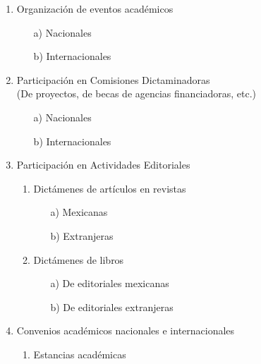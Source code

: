 \documentclass[12pt]{report}
\begin{document}
\begin{enumerate}
\begin{enumerate}
\begin{enumerate}
                \end{enumerate}
                \item Organización de eventos académicos
                        \begin{itemize}
                        \item[a)] Nacionales
                        \item[b)] Internacionales \\
                        \end{itemize}
                \item Participación en Comisiones Dictaminadoras\\ {\small (De proyectos, de becas de agencias financiadoras, etc.)}
                        \begin{itemize}
                        \item[a)] Nacionales
                        \item[b)] Internacionales \\
                        \end{itemize}
                \item Participación en Actividades Editoriales
                        \begin{enumerate}
                        \item Dictámenes de artículos en revistas
                                \begin{itemize}
                                \item[a)] Mexicanas
                                \item[b)] Extranjeras
                                \end{itemize}
                        \item Dictámenes de libros
                                \begin{itemize}
                                \item[a)] De editoriales mexicanas
                                \item[b)] De editoriales extranjeras \\
                                \end{itemize}
                        \end{enumerate}
                \item Convenios académicos nacionales e internacionales
                        \begin{enumerate}
                        \item Estancias académicas

\end{enumerate}
\end{enumerate}
\end{enumerate}
\end{document}
